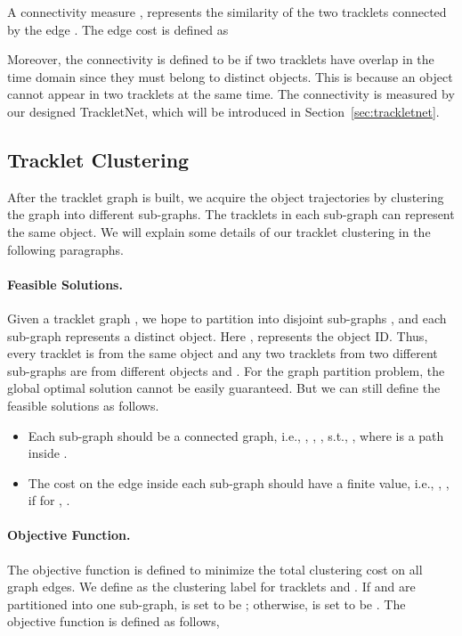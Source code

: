 \documentclass[10pt,twocolumn,letterpaper]{article}
\begin{document}
A connectivity measure , represents the similarity of the two tracklets connected by the edge . The edge cost is defined as

Moreover, the connectivity is defined to be  if two tracklets have overlap in the time domain since they must belong to distinct objects. This is because an object cannot appear in two tracklets at the same time. 
The connectivity is measured by our designed TrackletNet, which will be introduced in Section~\ref{sec:trackletnet}.


\subsection{Tracklet Clustering}




After the tracklet graph is built, we acquire the object trajectories by clustering the graph into different sub-graphs. The tracklets in each sub-graph can represent the same object. We will explain some details of our tracklet clustering in the following paragraphs.

\paragraph{Feasible Solutions.} 
Given a tracklet graph , we hope to partition  into disjoint sub-graphs , and each sub-graph represents a distinct object. Here ,  represents the object ID.
Thus, every tracklet  is from the same object  and any two tracklets  from two different sub-graphs are from different objects  and . For the graph partition problem, the global optimal solution cannot be easily guaranteed. But we can still define the feasible solutions as follows.
\begin{itemize}
\setlength\itemsep{-0.2em}
    \item Each sub-graph  should be a connected graph, i.e., ,  , , s.t., , where  is a path inside .
\item The cost on the edge inside each sub-graph should have a finite value, i.e., , , if  for , .
\end{itemize}

\paragraph{Objective Function.} 
The objective function is defined to minimize the total clustering cost on all graph edges. We define  as the clustering label for tracklets  and . If  and  are partitioned into one sub-graph,  is set to be ; otherwise,  is set to be . The objective function is defined as follows,
\end{document}
